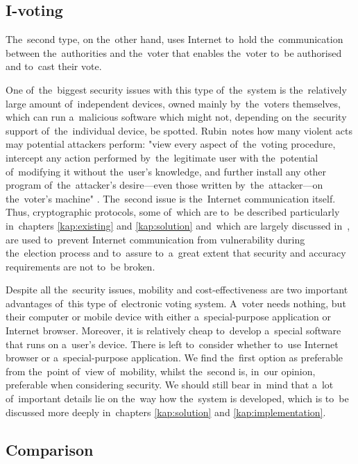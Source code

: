 \subsection{I-voting}
The~second type, on the~other hand, uses Internet to~hold the~communication between the~authorities and the~voter that enables the~voter to~be authorised and to~cast their vote. 

One of~the~biggest security issues with this type of~the~system is the~relatively large amount of~independent devices, owned mainly by~the~voters themselves, which can run a~malicious software which might not, depending on the~security support of~the~individual device, be spotted. 
Rubin~notes how many violent acts may potential attackers perform: "view every aspect of~the~voting procedure, intercept any action performed by~the~legitimate user with the~potential of~modifying it without the~user’s knowledge, and further install any other program of~the~attacker’s desire—even those written by~the~attacker—on the~voter’s machine" \cite{Rubin}.  The~second issue is the~Internet communication itself. Thus, cryptographic protocols, some of~which are to~be described particularly in~chapters \ref{kap:existing} and \ref{kap:solution} and~which are largely discussed in~\cite{Rjaskova}, are used to~prevent Internet communication from vulnerability during the~election process and to~assure to~a~great extent that security and accuracy requirements are not to~be broken.

Despite all the~security issues, mobility and cost-effectiveness are two important advantages of~this type of~electronic voting system. A~voter needs nothing, but their computer or mobile device with either a~special-purpose application or Internet browser. Moreover, it is relatively cheap to~develop a~special software that runs on a~user's device. There is left to~consider whether to~use Internet browser or a~special-purpose application. We find the~first option as preferable from the~point of~view of~mobility, whilst the~second is, in~our opinion, preferable when considering security. We should still bear in~mind that a~lot of~important details lie on the~way how the~system is developed, which is to~be discussed more deeply in~chapters \ref{kap:solution} and \ref{kap:implementation}.

\subsection{Comparison}

